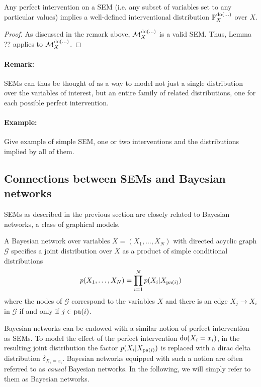 \begin{lemma}\label{lemma:acyclic-sem-well-defined-int-dist}
	Any perfect intervention on a SEM (i.e. any subset of variables set to any particular values) implies a well-defined interventional distribution $\mathbb{P}^{\operatorname{do}(...)}_X$ over $X$.
\end{lemma}
\begin{proof}
	As discussed in the remark above, $\mathcal{M}_X^{\operatorname{do}(...)}$ is a valid SEM. Thus, Lemma ?? applies to $\mathcal{M}_X^{\operatorname{do}(...)}$.
\end{proof}
	
\paragraph{Remark:} SEMs can thus be thought of as a way to model not just a single distribution over the variables of interest, but an entire family of related distributions, one for each possible perfect intervention.


\paragraph{Example:} Give example of simple SEM, one or two interventions and the distributions implied by all of them.

\subsection{Connections between SEMs and Bayesian networks}

SEMs as described in the previous section are closely related to Bayesian networks, a class of graphical models.
\begin{definition}
A Bayesian network over variables $X = (X_1,\ldots, X_N)$ with directed acyclic graph $\mathcal{G}$ specifies a joint distribution over $X$ as a product of simple conditional distributions
\begin{align*}
	p(X_1,\ldots,X_N) = \prod_{i=1}^N p(X_i | X_{\operatorname{pa}(i)})
\end{align*}
where the nodes of $\mathcal{G}$ correspond to the variables $X$ and there is an edge $X_j \to X_i$ in $\mathcal{G}$ if and only if $j \in \operatorname{pa}(i)$.
\end{definition}


Bayesian networks can be endowed with a similar notion of perfect intervention as SEMs. To model the effect of the perfect intervention $\operatorname{do}(X_i = x_i)$, in the resulting joint distribution the factor $p(X_i | X_{\operatorname{pa}(i)})$ is replaced with a dirac delta distribution $\delta_{X_i = x_i}$. 
Bayesian networks equipped with such a notion are often referred to as \emph{causal} Bayesian networks. 
In the following, we will simply refer to them as Bayesian networks.


